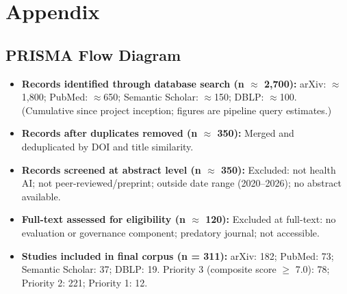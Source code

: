 
\section*{Appendix}
\label{sec:appendix}


\subsection{PRISMA Flow Diagram}
\label{sec:prisma}

\begin{itemize}
\item \textbf{Records identified through database search (n $\approx$ 2,700):}
  arXiv: $\approx$1,800; PubMed: $\approx$650; Semantic Scholar: $\approx$150; DBLP: $\approx$100.
  (Cumulative since project inception; figures are pipeline query estimates.)
\item \textbf{Records after duplicates removed (n $\approx$ 350):} Merged and deduplicated by DOI and title similarity.
\item \textbf{Records screened at abstract level (n $\approx$ 350):}
  Excluded: not health AI; not peer-reviewed/preprint; outside date range (2020--2026); no abstract available.
\item \textbf{Full-text assessed for eligibility (n $\approx$ 120):}
  Excluded at full-text: no evaluation or governance component; predatory journal; not accessible.
\item \textbf{Studies included in final corpus (n = 311):}
  arXiv: 182; PubMed: 73; Semantic Scholar: 37; DBLP: 19.
  Priority 3 (composite score $\ge$ 7.0): 78; Priority 2: 221; Priority 1: 12.
\end{itemize}


